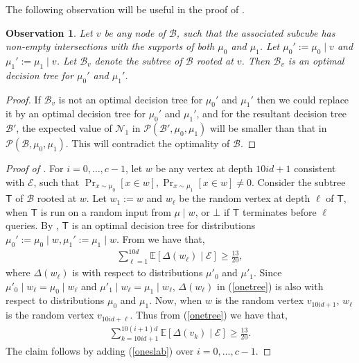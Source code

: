 \documentclass{toc}
\newcommand{\clB}{\mathcal{B}}
\newcommand{\clE}{\mathcal{E}}
\newcommand{\clP}{\mathcal{P}}
\newcommand{\clN}{\mathcal{N}}
\newcommand{\E}{\mathbb{E}}
\newtheorem{observation}[theorem]{Observation}
\begin{document}
The following observation will be useful in the proof of .
\begin{observation}
\label{recursive}
Let $v$ be any node of $\clB$, such that the associated subcube has non-empty intersections with the supports of both $\mu_0$ and $\mu_1$. Let $\mu_0':=\mu_0 \mid v$ and $\mu_1':=\mu_1 \mid v$. Let $\clB_v$ denote the subtree of $\clB$ rooted at $v$. Then $\clB_v$ is an optimal  decision tree for $\mu_0'$ and $\mu_1'$.
\end{observation}
\begin{proof}
If $\clB_v$ is not an optimal decision tree for $\mu_0'$ and $\mu_1'$ then we could replace it by an optimal decision tree for $\mu_0'$ and $\mu_1'$, and for the resultant decision tree $\clB'$, the expected value of $\clN_1$ in $\clP(\clB', \mu_0, \mu_1)$ will be smaller than that in $\clP(\clB, \mu_0, \mu_1)$. This will contradict the optimality of $\clB$.
\end{proof}
\begin{proof}[Proof of {}]
For $i=0,\ldots, c-1$, let $w$ be any vertex at depth $10id+1$ consistent with $\clE$, such that $\Pr_{x \sim \mu_0}[x \in w], \Pr_{x \sim \mu_1}[x \in w] \neq 0$. Consider the subtree $\mathsf{T}$ of $\clB$ rooted at $w$. Let $w_1:=w$ and $w_\ell$ be the random vertex at depth $\ell$ of $\mathsf{T}$, when $\mathsf{T}$ is run on a random input from $\mu \mid w$, or $\bot$ if $\mathsf{T}$ terminates before $\ell$ queries. By , $\mathsf{T}$ is an optimal decision tree for distributions $\mu_0':=\mu_0 \mid w, \mu_1':=\mu_1 \mid w$. From  we have that,
\begin{align}
\sum_{\ell=1}^{10d} \E[\Delta(w_\ell) \mid \clE]  \geq \frac{13}{20}, \label{onetree}
\end{align}
where $\Delta(w_\ell)$ is with respect to distributions $\mu'_0$ and $\mu'_1$. Since $\mu'_0 \mid w_\ell=\mu_0 \mid w_\ell$ and $\mu'_1 \mid w_\ell=\mu_1 \mid w_\ell$, $\Delta(w_\ell)$ in (\ref{onetree}) is also with respect to distributions $\mu_0$ and $\mu_1$. Now, when $w$ is the random vertex $v_{10id+1}$, $w_\ell$ is the random vertex $v_{10id+\ell}$. Thus from (\ref{onetree}) we have that,
\begin{align}
\sum _{k=10id+1}^{10(i+1)d} \E[\Delta(v_k) \mid \clE]  \geq \frac{13}{20}. \label{oneslab}
\end{align}
The claim follows by adding (\ref{oneslab}) over $i=0, \ldots, c-1$.
\end{proof}
\end{document}
